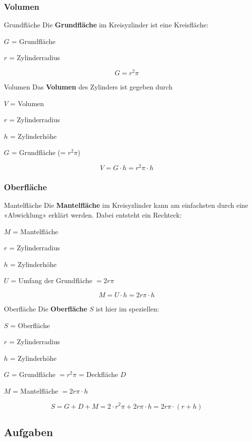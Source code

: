 \subsubsection{Volumen}

\begin{bemerkung}{Grundfläche}{}
  Die \textbf{Grundfläche} im Kreisyzlinder ist eine Kreisfläche:

  $G$ = Grundfläche

  $r$ = Zylinderradius
  
  $$G = r^2\pi$$
\end{bemerkung}

\begin{gesetz}{Volumen}{}
  Das \textbf{Volumen} des Zylinders ist gegeben durch

  $V$ = Volumen

  $r$ = Zylinderradius

  $h$ = Zylinderhöhe

  $G$ = Grundfläche (= $r^2\pi$)

  $$V = G\cdot{}h = r^2\pi\cdot{} h $$
\end{gesetz}
\newpage

\subsubsection{Oberfläche}


\begin{bemerkung}{Mantelfläche}{}
  Die \textbf{Mantelfläche} im Kreisyzlinder kann am einfachsten durch eine «Abwicklung» erklärt werden. Dabei entsteht ein Rechteck:

  $M$ = Mantelfläche

  $r$ = Zylinderradius

  $h$ = Zylinderhöhe

  $U$ = Umfang der Grundfläche $= 2r\pi$
  
  $$M = U\cdot{}h = 2r\pi\cdot{}h$$
\end{bemerkung}

\begin{gesetz}{Oberfläche}{}
  Die \textbf{Oberfläche} $S$ ist hier im speziellen:

  $S$ = Oberfläche

  $r$ = Zylinderradius

  $h$ = Zylinderhöhe

  $G$ = Grundfläche $=r^2\pi$ = Deckfläche $D$

  $M$ = Mantelfläche $=2r\pi\cdot{}h $
  
  $$S = G + D + M = 2\cdot{}r^2\pi + 2r\pi\cdot{}h = 2r\pi\cdot{}(r + h)$$
\end{gesetz}
\newpage

\subsection*{Aufgaben}

\newpage
